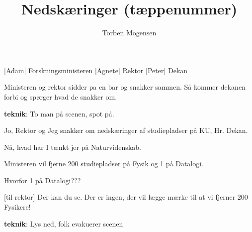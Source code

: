 \documentclass[a4paper,11pt]{article}
\title{Nedskæringer (tæppenummer)}
\author{Torben Mogensen}
\begin{document}
\maketitle

\begin{roles}
[Adam] Forskningsministeren
[Agnete] Rektor
[Peter] Dekan
\end{roles}

\begin{sketch}
\scene Ministeren og rektor sidder pa en bar og snakker sammen.  Så
kommer dekanen forbi og spørger hvad de snakker om.

\scene \textbf{teknik}: To man på scenen, spot på.

 Jo, Rektor og Jeg snakker om nedskæringer af
studiepladser på KU, Hr. Dekan.

 Nå, hvad har I tænkt jer på Naturvidenskab.

 Ministeren vil fjerne 200 studiepladser på Fysik og 1 på
Datalogi.

 Hvorfor 1 på Datalogi???

[til rektor] Der kan du se. Der er ingen, der vil lægge mærke
til at vi fjerner 200 Fysikere!

\scene \textbf{teknik}: Lys ned, folk evakuerer scenen

\end{sketch}
\end{document}
